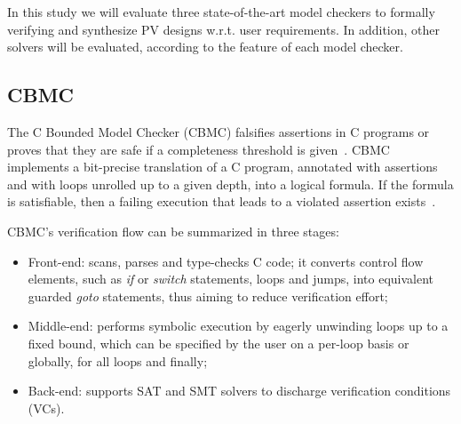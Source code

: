 
In this study we will evaluate three state-of-the-art model checkers to formally verifying and synthesize PV designs w.r.t. user requirements. In addition, other solvers will be evaluated, according to the feature of each model checker.

\subsection{CBMC}

The C Bounded Model Checker (CBMC) falsifies assertions in C programs or proves that they are safe if a completeness threshold is given~\cite{Kroening}. CBMC implements a bit-precise translation of a C program, annotated with assertions and with loops unrolled up to a given depth, into a logical formula. If the formula is satisfiable, then a failing execution that leads to a violated assertion exists~\cite{Kroening}. 

CBMC's verification flow can be summarized in three stages: 

\begin{itemize}
\item Front-end: scans, parses and type-checks C code; it converts control flow elements, such as \textit{if} or \textit{switch} statements, loops and jumps, into equivalent guarded \textit{goto} statements, thus aiming to reduce verification effort; 
\item Middle-end: performs symbolic execution by eagerly unwinding loops up to a fixed bound, which can be specified by the user on a per-loop basis or globally, for all loops and finally; 
\item Back-end: supports SAT and SMT solvers to discharge verification conditions (VCs).
\end{itemize}

